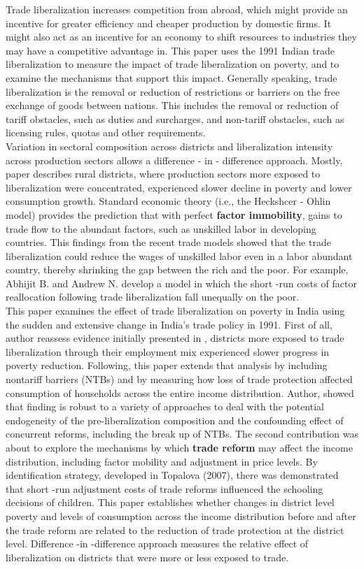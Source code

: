 \documentclass[a4paper,12pt]{article}
\begin{document}
Trade liberalization increases competition from abroad, which might provide an incentive for greater efficiency and cheaper production by domestic firms. It might also act as an incentive for an economy to shift resources to industries they may have a competitive advantage in.  
This paper uses the 1991 Indian trade liberalization to measure the impact of trade liberalization on poverty, and to examine the mechanisms that support this impact. Generally speaking, trade liberalization is the removal or reduction of restrictions or barriers on the free exchange of goods between nations. This includes the removal or reduction of tariff obstacles, such as duties and surcharges, and non-tariff obstacles, such as licensing rules, quotas and other requirements.
\\ Variation in sectoral composition across districts and liberalization intensity across production sectors allows a difference - in - difference approach. Mostly, paper describes rural districts, where production sectors more exposed to liberalization were concentrated, experienced slower decline in poverty and lower consumption growth. 
Standard economic theory (i.e., the Heckshcer - Ohlin model) provides the prediction that with perfect \textbf{factor immobility}, gains to trade flow to the abundant factors, such as unskilled labor in developing countries. This findings from the recent trade models showed that the trade liberalization could reduce the wages of unskilled labor even in a labor abundant country, thereby shrinking the gap between the rich and the poor. \cite{Stiglitz70} For example, Abhijit B. and Andrew N. develop a model in which the short -run costs of factor reallocation following trade liberalization fall unequally on the poor.    
\\ This paper examines the effect of trade liberalization on poverty in India using the sudden and extensive change in India's trade policy in 1991. First of all, author reassess evidence initially presented in \cite{Topalova10}, districts more exposed to trade liberalization through their employment mix experienced slower progress in poverty reduction. Following, this paper extends that analysis by including nontariff barriers (NTBs) and by measuring how loss of trade protection affected consumption of households across the entire income distribution. Author, showed that finding is robust to a variety of approaches to deal with the potential endogeneity of the pre-liberalization composition and the confounding effect of concurrent reforms, including the break up of NTBs. The second contribution was about to explore the mechanisms by which \textbf{trade reform} may affect the income distribution, including factor mobility and adjustment in price levels. By identification strategy, developed in Topalova (2007), there was demonstrated that short -run adjustment costs of trade reforms influenced the schooling decisions of children. This paper establishes whether changes in district level poverty and levels of consumption across the income distribution before and after the trade reform are related to the reduction of trade protection at the district level. Difference -in -difference approach measures the relative effect of liberalization on districts that were more or less exposed to trade. 
\end{document}
